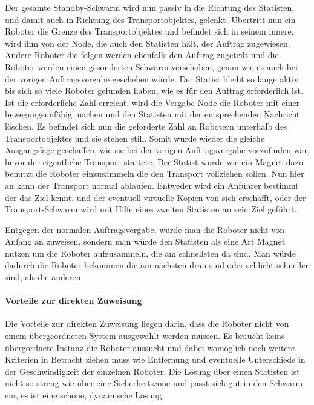 Der gesamte Standby-Schwarm wird nun passiv in die Richtung des Statisten, und damit auch in Richtung des Transportobjektes, gelenkt. Übertritt nun ein Roboter die Grenze des Transportobjektes und befindet sich in seinem innere, wird ihm von der Node, die auch den Statisten hält, der Auftrag zugewiesen. Andere Roboter die folgen werden ebenfalls den Auftrag zugeteilt und die Roboter werden einen gesonderten Schwarm verschoben, genau wie es auch bei der vorigen Auftragsvergabe geschehen würde. Der Statist bleibt so lange aktiv bis sich so viele Roboter gefunden haben, wie es für den Auftrag erforderlich ist. Ist die erforderliche Zahl erreicht, wird die Vergabe-Node die Roboter mit einer  bewegungsunfähig machen und den Statisten mit der entsprechenden Nachricht löschen. Es befindet sich nun die geforderte Zahl an Robotern unterhalb des Transportobjektes und sie stehen still. Somit wurde wieder die gleiche Ausgangslage geschaffen, wie sie bei der vorigen Auftragsvergabe vorzufinden war, bevor der eigentliche Transport startete. Der Statist wurde wie ein Magnet dazu benutzt die Roboter einzusammeln die den Transport vollziehen sollen.
Nun hier an kann der Transport normal ablaufen. Entweder wird ein Anführer bestimmt der das Ziel kennt, und der eventuell virtuelle Kopien von sich erschafft, oder der Transport-Schwarm wird mit Hilfe eines zweiten Statisten an sein Ziel geführt.

Entgegen der normalen Auftragsvergabe, würde man die Roboter nicht von Anfang an zuweisen, sondern man würde den Statisten als eine Art Magnet nutzen um die Roboter aufzusammeln, die am schnellsten da sind. Man würde dadurch die Roboter bekommen die am nächsten dran sind oder schlicht schneller sind, als die anderen.

\paragraph*{Vorteile zur direkten Zuweisung}
Die Vorteile zur direkten Zuweisung liegen darin, dass die Roboter nicht von einem übergeordneten System ausgewählt werden müssen. Es braucht keine übergordnete Instanz die Roboter aussucht und dabei womöglich noch weitere Kriterien in Betracht ziehen muss wie Entfernung und eventuelle Unterschiede in der Geschwindigkeit der einzelnen Roboter. Die Lösung über einen Statisten ist nicht so streng wie über eine Sicherheitszone und passt sich gut in den Schwarm ein, es ist eine schöne, dynamische Lösung.

